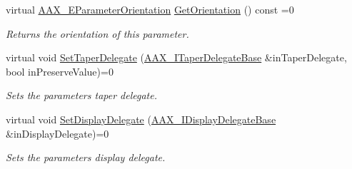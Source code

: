\begin{DoxyCompactItemize}
virtual \mbox{\hyperlink{a00491_a52f91d1c14aa5dceedabfb9d2de31bf0}{A\+A\+X\+\_\+\+E\+Parameter\+Orientation}} \mbox{\hyperlink{a01857_a232110d283340a29aa33a4eff3bcca03}{Get\+Orientation}} () const =0
\begin{DoxyCompactList}\small\item\em Returns the orientation of this parameter. \end{DoxyCompactList}\item 
virtual void \mbox{\hyperlink{a01857_a809a5c7f712ed2e5c55e30b6d5557c59}{Set\+Taper\+Delegate}} (\mbox{\hyperlink{a01877}{A\+A\+X\+\_\+\+I\+Taper\+Delegate\+Base}} \&in\+Taper\+Delegate, bool in\+Preserve\+Value)=0
\begin{DoxyCompactList}\small\item\em Sets the parameter\textquotesingle{}s taper delegate. \end{DoxyCompactList}\item 
virtual void \mbox{\hyperlink{a01857_a16a75d76f077051eb6f852cde28f5152}{Set\+Display\+Delegate}} (\mbox{\hyperlink{a01797}{A\+A\+X\+\_\+\+I\+Display\+Delegate\+Base}} \&in\+Display\+Delegate)=0
\begin{DoxyCompactList}\small\item\em Sets the parameter\textquotesingle{}s display delegate. \end{DoxyCompactList}\end{DoxyCompactItemize}
